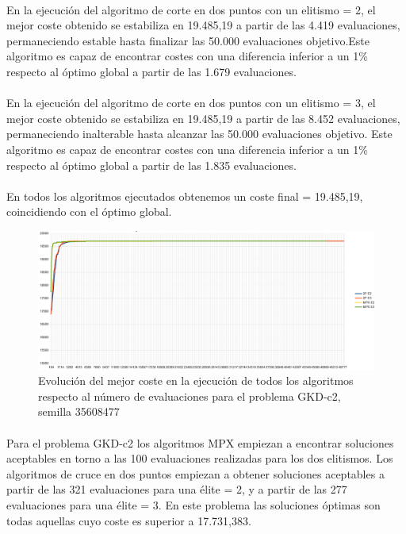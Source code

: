 	\paragraph{}En la ejecución del algoritmo de corte en dos puntos con un elitismo = 2, el mejor coste obtenido se estabiliza en 19.485,19 a partir de las 4.419 evaluaciones, permaneciendo estable hasta finalizar las 50.000 evaluaciones objetivo.Este algoritmo es capaz de encontrar costes con una diferencia inferior a un 1\% respecto al óptimo global a partir de las 1.679 evaluaciones.
	
	\paragraph{}En la ejecución del algoritmo de corte en dos puntos con un elitismo = 3, el mejor coste obtenido se estabiliza en 19.485,19 a partir de las 8.452 evaluaciones, permaneciendo inalterable hasta alcanzar las 50.000 evaluaciones objetivo. Este algoritmo es capaz de encontrar costes con una diferencia inferior a un 1\% respecto al óptimo global a partir de las 1.835 evaluaciones.
	
	\paragraph{}En todos los algoritmos ejecutados obtenemos un coste final = 19.485,19, coincidiendo con el óptimo global.

	\begin{figure}[H]
		\centering
		\includegraphics[scale=0.3]{img/35608477_GKD-c_2_n500_m50.png}
		\caption{Evolución del mejor coste en la ejecución de todos los algoritmos respecto al número de evaluaciones para el problema GKD-c2, semilla 35608477}
		\label{gkd-c2_historico}
	\end{figure}

	\paragraph{}Para el problema GKD-c2 los algoritmos MPX empiezan a encontrar soluciones aceptables en torno a las 100 evaluaciones realizadas para los dos elitismos. Los algoritmos de cruce en dos puntos empiezan a obtener soluciones aceptables a partir de las 321 evaluaciones para una élite = 2, y a partir de las 277 evaluaciones para una élite = 3. En este problema las soluciones óptimas son todas aquellas cuyo coste es superior a 17.731,383.
	
